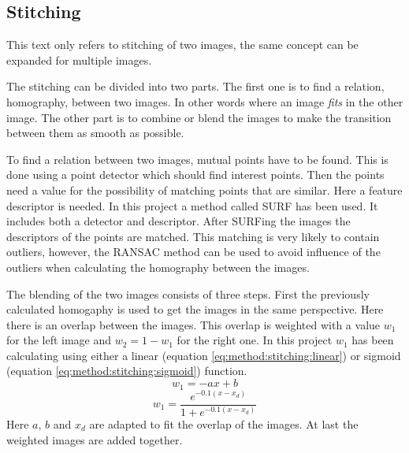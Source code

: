 \subsection{Stitching}
This text only refers to stitching of two images, the same concept can be expanded for multiple images.

The stitching can be divided into two parts.
The first one is to find a relation, homography, between two images.
In other words where an image {\it fits} in the other image.
The other part is to combine or blend the images to make the transition between them as smooth as possible.

To find a relation between two images, mutual points have to be found.
This is done using a point detector which should find interest points.
Then the points need a value for the possibility of matching points that are similar.
Here a feature descriptor is needed.
In this project a method called SURF has been used.
It includes both a detector and descriptor.
After SURFing the images the descriptors of the points are matched.
This matching is very likely to contain outliers, however, the RANSAC method can be used to avoid influence of the outliers when calculating the homography between the images.

The blending of the two images consists of three steps.
First the previously calculated homogaphy is used to get the images in the same perspective.
Here there is an overlap between the images.
This overlap is weighted with a value $w_1$ for the left image and $w_2 = 1 - w_1$ for the right one.
In this project $w_1$ has been calculating using either a linear (equation \ref{eq:method:stitching:linear}) or sigmoid (equation \ref{eq:method:stitching:sigmoid}) function.
\begin{equation} \label{eq:method:stitching:linear}
  w_1 = -a x + b
\end{equation}
\begin{equation} \label{eq:method:stitching:sigmoid}
  w_1 = \frac{e^{-0.1(x - x_d)}}{1 + e^{-0.1(x - x_d)}}
\end{equation}
Here $a$, $b$ and $x_d$ are adapted to fit the overlap of the images.
At last the weighted images are added together.
